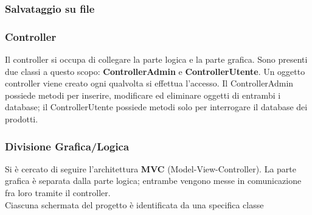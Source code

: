 \documentclass[a4paper,10pt] {article}
\begin{document}
\subsubsection{Salvataggio su file}

\subsubsection{Controller}
Il controller si occupa di collegare la parte logica e la parte grafica. Sono presenti due classi a questo scopo: \textbf{ControllerAdmin} e \textbf{ControllerUtente}.
Un oggetto controller viene creato ogni qualvolta si effettua l'accesso. Il ControllerAdmin possiede metodi per inserire, modificare ed eliminare oggetti di
entrambi i database; il ControllerUtente possiede metodi solo per interrogare il database dei prodotti.

\subsubsection{Divisione Grafica/Logica}
Si è cercato di seguire l'architettura \textbf{MVC} (Model-View-Controller). La parte grafica è separata dalla parte logica; entrambe vengono messe in comunicazione
fra loro tramite il controller.\\
Ciascuna schermata del progetto è identificata da una specifica classe
\end{document}
